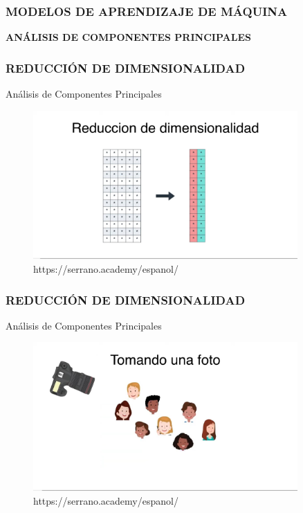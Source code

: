 \documentclass{beamer}
\begin{document}
\begin{frame}
	\frametitle{MODELOS DE APRENDIZAJE DE MÁQUINA}
	\begin{block}{}	
		\center
		\textbf{ANÁLISIS DE COMPONENTES PRINCIPALES}
	\end{block}
\end{frame}

\begin{frame}
	\frametitle{REDUCCIÓN DE DIMENSIONALIDAD}
	\begin{block}{Análisis de Componentes Principales}	
		\begin{figure}
			\includegraphics[width=0.9\textwidth]{PCA/IMG_3525.jpg}
			\caption{https://serrano.academy/espanol/}
		\end{figure}
	\end{block}
\end{frame}

\begin{frame}
\frametitle{REDUCCIÓN DE DIMENSIONALIDAD}
\begin{block}{Análisis de Componentes Principales}	
	\begin{figure}
		\includegraphics[width=0.9\textwidth]{PCA/IMG_3526.jpg}
		\caption{https://serrano.academy/espanol/}
	\end{figure}
\end{block}
\end{frame}
\end{document}
